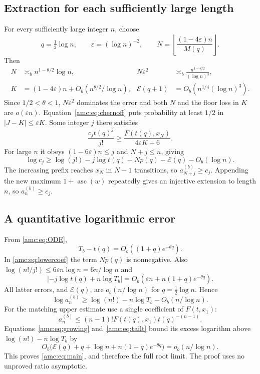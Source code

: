 \documentclass[11pt,letterpaper]{article}
\theoremstyle{remark}\newtheorem{remark}[theorem]{Remark}
\newcommand{\asc}{\operatorname{asc}}
\newcommand{\Err}{\mathcal E}
\begin{document}
\subsection{Extraction for each sufficiently large length}
For every sufficiently large integer $n$, choose
\[
 q=\tfrac12\log n,\qquad\varepsilon=(\log n)^{-2},\qquad
 N=\left\lfloor\frac{(1-4\varepsilon)n}{M(q)}\right\rfloor.
\]
Then
\begin{align*}
 N&\asymp_b n^{1-\theta/2}\log n,&
 N\varepsilon^2&\asymp_b\frac{n^{1-\theta/2}}{(\log n)^3},\\
 K&=(1-4\varepsilon)n+O_b(n^{\theta/2}/\log n),&
 \Err(q+1)&=O_b(n^{1/4}(\log n)^3).
\end{align*}
Since $1/2<\theta<1$, $N\varepsilon^2$ dominates the error and both $N$ and the floor loss in $K$ are $o(\varepsilon n)$. Equation~\eqref{amc:eq:chernoff} puts probability at least $1/2$ in $|J-K|\le\varepsilon K$. Some integer $j$ there satisfies
\[
 \frac{c_jt(q)^j}{j!}\ge\frac{F(t(q),x_N)}{4\varepsilon K+6}.
\]
For large $n$ it obeys $(1-6\varepsilon)n\le j$ and $N+j\le n$, giving
\begin{equation}\label{amc:eq:lowercoef}
 \log c_j\ge\log(j!)-j\log t(q)+Np(q)-\Err(q)-O_b(\log n).
\end{equation}
The increasing prefix reaches $x_N$ in $N-1$ transitions, so $a_{N+j}^{(b)}\ge c_j$. Appending the new maximum $1+\asc(w)$ repeatedly gives an injective extension to length $n$, so $a_n^{(b)}\ge c_j$.

\subsection{A quantitative logarithmic error}\label{amc:sec:logerror}
From \eqref{amc:eq:ODE},
\begin{equation}\label{amc:eq:tailt}
 T_b-t(q)=O_b((1+q)e^{-\theta q}).
\end{equation}
In \eqref{amc:eq:lowercoef} the term $Np(q)$ is nonnegative. Also
$\log(n!/j!)\le6\varepsilon n\log n=6n/\log n$ and
\[
 |-j\log t(q)+n\log T_b|
 =O_b(\varepsilon n+n(1+q)e^{-\theta q}).
\]
All latter errors, and $\Err(q)$, are $o_b(n/\log n)$ for $q=\frac12\log n$. Hence
\[
 \log a_n^{(b)}\ge\log(n!)-n\log T_b-O_b(n/\log n).
\]
For the matching upper estimate use a single coefficient of $F(t,x_1)$:
\[
 a_n^{(b)}\le (n-1)!F(t(q),x_1)t(q)^{-(n-1)}.
\]
Equations~\eqref{amc:eq:growing} and~\eqref{amc:eq:tailt} bound its excess logarithm above $\log(n!)-n\log T_b$ by
\[
 O_b\bigl(\Err(q)+q+\log n+n(1+q)e^{-\theta q}\bigr)
 =o_b(n/\log n).
\]
This proves \eqref{amc:eq:main}, and therefore the full root limit. The proof uses no unproved ratio asymptotic.
\end{document}
